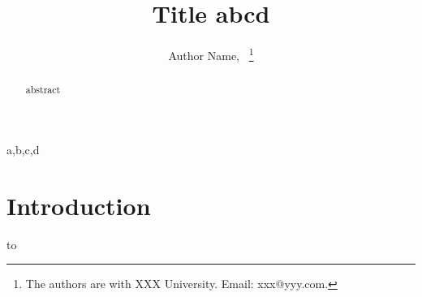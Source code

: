 \documentclass[journal]{IEEEtran}   %
\begin{document}
\title{\Huge{Title abcd}}

\author{Author Name,~
\thanks{The authors are with XXX University. Email: xxx@yyy.com.}
}
    
\maketitle

\begin{abstract}
abstract
\end{abstract}
\begin{IEEEkeywords}
a,b,c,d
\end{IEEEkeywords}

\section{Introduction}
 to \cite{initcite}




\end{document}
